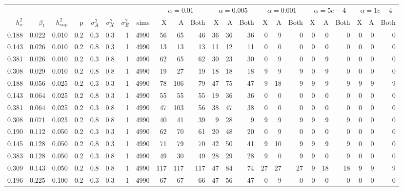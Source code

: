 \documentclass[11pt]{article} %
\begin{document}
\newpage
\landscape
\begin{table}[ht]
\centering
\tiny
\begin{tabular}{rrrrrrrr|rrr|rrr|rrr|rrr|rrr}
  \hline
& & & & & & &&\multicolumn{3}{c}{$\alpha=0.01$} & \multicolumn{3}{c}{$\alpha=0.005$} & \multicolumn{3}{c}{$\alpha=0.001$} & \multicolumn{3}{c}{$\alpha=5e-4$}&\multicolumn{3}{c}{$\alpha=1e-4$}\\
$h^2_{x}$& $\beta_1$ & $h^2_{snp}$ & p & $\sigma^2_A$ & $\sigma^2_X$ & $\sigma^2_E$ &sims& X & A & Both &X & A & Both & X &A & Both & X & A & Both & X & A & Both\\ 
  \hline
0.188& 0.022 & 0.010 & 0.2 & 0.3 & 0.3 & 1 & 4990 & 56 & 65 & 46 & 36 & 36 & 36 & 0 & 9 & 0 & 0 & 0 & 0 & 0 & 0 & 0 \\ 
0.143& 0.026 & 0.010 & 0.2 & 0.8 & 0.3 & 1 & 4990 & 13 & 13 & 13 & 11 & 12 & 11 & 0 & 0 & 0 & 0 & 0 & 0 & 0 & 0 & 0 \\ 
 0.381&0.026 & 0.010 & 0.2 & 0.3 & 0.8 & 1 & 4990 & 62 & 65 & 62 & 30 & 23 & 30 & 0 & 9 & 0 & 0 & 9 & 0 & 0 & 0 & 0 \\ 
 0.308&0.029 & 0.010 & 0.2 & 0.8 & 0.8 & 1 & 4990 & 19 & 27 & 19 & 18 & 18 & 18 & 9 & 9 & 9 & 0 & 9 & 0 & 0 & 0 & 0 \\ \hline
0.188&0.056 & 0.025 & 0.2 & 0.3 & 0.3 & 1 & 4990 & 78 & 106 & 79 & 47 & 75 & 47 & 9 & 18 & 9 & 9 & 9 & 9 & 9 & 9 & 9 \\ 
0.143 &0.064 & 0.025 & 0.2 & 0.8 & 0.3 & 1 & 4990 & 55 & 55 & 55 & 19 & 36 & 36 & 0 & 0 & 0 & 0 & 0 & 0 & 0 & 0 & 0 \\ 
0.381&0.064 & 0.025 & 0.2 & 0.3 & 0.8 & 1 & 4990 & 47 & 103 & 56 & 38 & 47 & 38 & 0 & 0 & 0 & 0 & 0 & 0 & 0 & 0 & 0 \\ 
0.308 &0.071 & 0.025 & 0.2 & 0.8 & 0.8 & 1 & 4990 & 40 & 41 & 39 & 9 & 28 & 9 & 9 & 9 & 9 & 9 & 9 & 9 & 0 & 0 & 0 \\ \hline
0.190& 0.112 & 0.050 & 0.2 & 0.3 & 0.3 & 1 & 4990 & 62 & 70 & 61 & 20 & 48 & 20 & 0 & 9 & 0 & 0 & 0 & 0 & 0 & 0 & 0 \\ 
0.145 &0.128 & 0.050 & 0.2 & 0.8 & 0.3 & 1 & 4990 & 71 & 79 & 70 & 42 & 50 & 41 & 9 & 10 & 9 & 9 & 9 & 9 & 0 & 0 & 0 \\ 
0.383&0.128 & 0.050 & 0.2 & 0.3 & 0.8 & 1 & 4990 & 49 & 30 & 49 & 28 & 29 & 28 & 9 & 0 & 9 & 9 & 0 & 9 & 0 & 0 & 0 \\ 
0.309 &0.143 & 0.050 & 0.2 & 0.8 & 0.8 & 1 & 4990 & 117 & 117 & 117 & 47 & 84 & 74 & 27 & 27 & 27 & 9 & 18 & 18 & 9 & 9 & 9 \\ \hline
0.196&0.225 & 0.100 & 0.2 & 0.3 & 0.3 & 1 & 4990 & 67 & 67 & 66 & 47 & 56 & 47 & 0 & 9 & 0 & 0 & 0 & 0 & 0 & 0 & 0 \\ 

\end{tabular}
\end{table}
\end{document}

